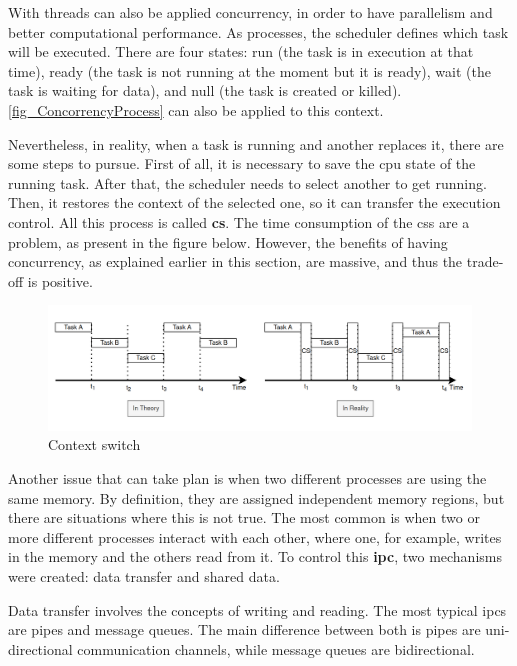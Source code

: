 With threads can also be applied concurrency, in order to have parallelism and better computational performance. As processes, the scheduler 
defines which task will be executed. There are four states: run (the task is in execution at that time), ready (the task is not running at the 
moment but it is ready), wait (the task is waiting for data), and null (the task is created or killed). \autoref{fig_ConcorrencyProcess} can also 
be applied to this context.

Nevertheless, in reality, when a task is running and another replaces it, there are some steps to pursue. First of all, it 
is necessary to save the \gls{cpu} state of the running task. After that, the scheduler needs to select another to get running. Then, it restores 
the context of the selected one, so it can transfer the execution control. All this process is called \textbf{\gls{cs}}. The time consumption of 
the \glspl{cs} are a problem, as present in the figure below. However, the benefits of having concurrency, as explained earlier in this section, 
are massive, and thus the trade-off is positive.

\begin{figure}[H]
	\centering
 	\includegraphics[width=1\linewidth]{Images/ContextSwitch.png}
 	\caption{ Context switch }
	 \label{fig_ContextSwitch}
\end{figure}

Another issue that can take plan is when two different processes are using the same memory. By definition, they are assigned independent 
memory regions, but there are situations where this is not true. The most common is when two or more different processes interact with each other, 
where one, for example, writes in the memory and the others read from it. To control this \textbf{\gls{ipc}}, two mechanisms were created: data 
transfer and shared data.

Data transfer involves the concepts of writing and reading. The most typical \glspl{ipc} are pipes and message queues. The main difference 
between both is pipes are uni-directional communication channels, while message queues are bidirectional.

